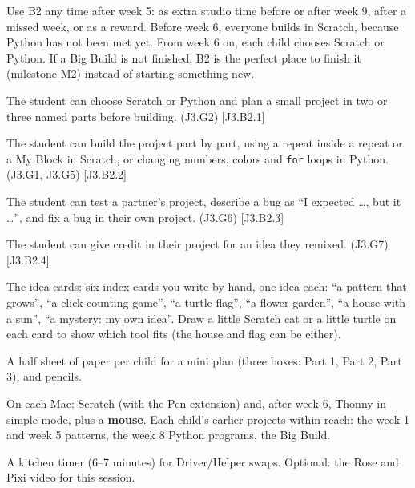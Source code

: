 
\begin{teachernote}
Use B2 any time after week 5: as extra studio time before or after week 9, after a missed week, or as a reward. Before week 6, everyone builds in Scratch, because Python has not been met yet. From week 6 on, each child chooses Scratch or Python. If a Big Build is not finished, B2 is the perfect place to finish it (milestone M2) instead of starting something new.
\end{teachernote}

\begin{objectives}
  \item The student can choose Scratch or Python and plan a small project in two or three named parts before building. (J3.G2) [J3.B2.1]
  \item The student can build the project part by part, using a repeat inside a repeat or a My Block in Scratch, or changing numbers, colors and \texttt{for} loops in Python. (J3.G1, J3.G5) [J3.B2.2]
  \item The student can test a partner's project, describe a bug as \enquote{I expected \ldots, but it \ldots}, and fix a bug in their own project. (J3.G6) [J3.B2.3]
  \item The student can give credit in their project for an idea they remixed. (J3.G7) [J3.B2.4]
\end{objectives}

\begin{materials}
  \item The idea cards: six index cards you write by hand, one idea each: \enquote{a pattern that grows}, \enquote{a click-counting game}, \enquote{a turtle flag}, \enquote{a flower garden}, \enquote{a house with a sun}, \enquote{a mystery: my own idea}. Draw a little Scratch cat or a little turtle on each card to show which tool fits (the house and flag can be either).
  \item A half sheet of paper per child for a mini plan (three boxes: Part 1, Part 2, Part 3), and pencils.
  \item On each Mac: Scratch (with the Pen extension) and, after week 6, Thonny in simple mode, plus a \textbf{mouse}. Each child's earlier projects within reach: the week 1 and week 5 patterns, the week 8 Python programs, the Big Build.
  \item A kitchen timer (6--7 minutes) for Driver/Helper swaps. Optional: the Rose and Pixi video for this session.
\end{materials}

